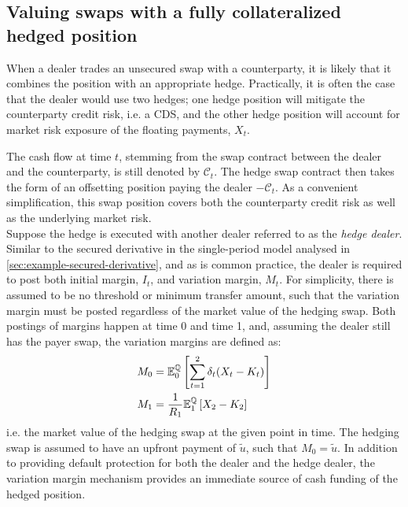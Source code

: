 \documentclass[main.tex]{subfiles}
\begin{document}
    \subsection{Valuing swaps with a fully collateralized hedged position}
    \label{sec:secured-swap-valuation}    
        When a dealer trades an unsecured swap with a counterparty,
        it is likely that it combines the position with an appropriate hedge.
        Practically, it is often the case that the dealer would use two hedges;
        one hedge position will mitigate the counterparty credit risk, i.e. a CDS,
        and the other hedge position will account for market risk exposure of the floating payments, $X_t$.
        
        The cash flow at time $t$, stemming from the swap contract between the dealer and the counterparty,
        is still denoted by $\mathcal{C}_t$.
        The hedge swap contract then takes the form of an offsetting position paying the dealer $-\mathcal{C}_t$.
        As a convenient simplification, this swap position covers both the counterparty credit risk as well as the underlying market risk.
        \\
        Suppose the hedge is executed with another dealer referred to as the \textit{hedge dealer}.
        Similar to the secured derivative in the single-period model analysed in \cref{sec:example-secured-derivative},
        and as is common practice,
        the dealer is required to post both initial margin, $I_{t}$, and variation margin, $M_{t}$.
        For simplicity, there is assumed to be no threshold or minimum transfer amount,
        such that the variation margin must be posted regardless of the market value of the hedging swap.
        Both postings of margins happen at time 0 and time 1,
        and, assuming the dealer still has the payer swap,
        the variation margins are defined as:
        \begin{align}
            M_0 &= \mathbb{E}_{0}^{\mathbb{Q}}\left[\sum_{t=1}^{2}\delta_t (X_t - K_t)\right]
            \\
            M_1 &= \frac{1}{R_1}\mathbb{E}_{1}^{\mathbb{Q}}\left[X_2 - K_2\right] 
        \end{align}
        i.e. the market value of the hedging swap at the given point in time.
        The hedging swap is assumed to have an upfront payment of $\tilde{u}$, such that $M_0 = \tilde{u}$.
        In addition to providing default protection for both the dealer and the hedge dealer,
        the variation margin mechanism provides an immediate source of cash funding of the hedged position. 
\end{document}
